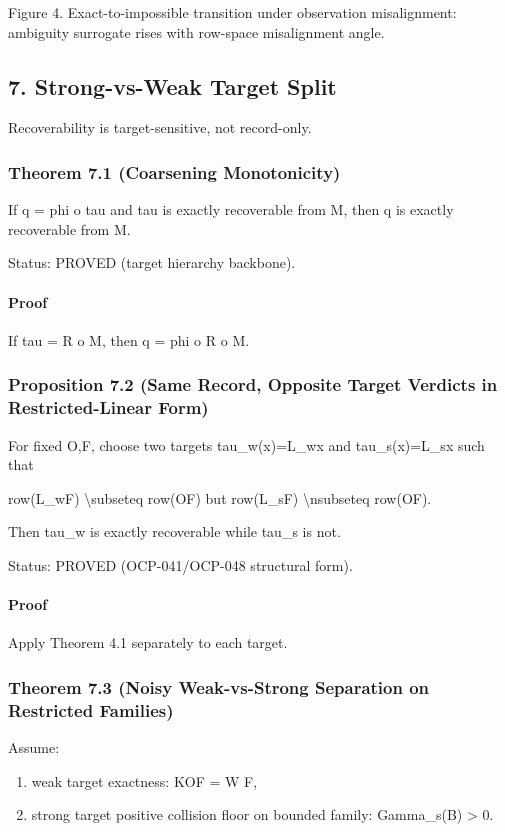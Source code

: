 \documentclass[11pt]{article}
\begin{document}
Figure 4. Exact-to-impossible transition under observation misalignment: ambiguity surrogate rises with row-space misalignment angle.


\subsection*{7. Strong-vs-Weak Target Split}
Recoverability is target-sensitive, not record-only.


\subsubsection*{Theorem 7.1 (Coarsening Monotonicity)}
If q = phi o tau and tau is exactly recoverable from M, then q is exactly recoverable from M.


Status: PROVED (target hierarchy backbone).


\paragraph{Proof}
If tau = R o M, then q = phi o R o M.


\subsubsection*{Proposition 7.2 (Same Record, Opposite Target Verdicts in Restricted-Linear Form)}
For fixed O,F, choose two targets tau\_w(x)=L\_wx and tau\_s(x)=L\_sx such that


row(L\_wF) \textbackslash{}subseteq row(OF) but row(L\_sF) \textbackslash{}nsubseteq row(OF).


Then tau\_w is exactly recoverable while tau\_s is not.


Status: PROVED (OCP-041/OCP-048 structural form).


\paragraph{Proof}
Apply Theorem 4.1 separately to each target.


\subsubsection*{Theorem 7.3 (Noisy Weak-vs-Strong Separation on Restricted Families)}
Assume:

\begin{enumerate}
\item weak target exactness: KOF = W F,
\item strong target positive collision floor on bounded family: Gamma\_s(B) > 0.
\end{enumerate}
\end{document}
